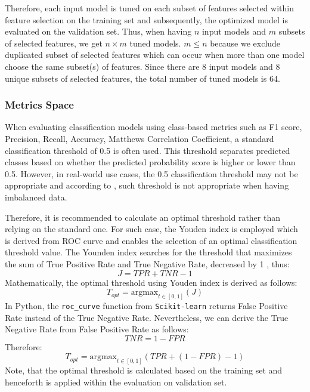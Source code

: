 \vspace{-1em}
Therefore, each input model is tuned on each subset of features selected within feature selection on the training set and subsequently, the optimized model is evaluated on the validation set. Thus, when having $n$ input models and $m$ subsets of selected features, we get $n \times m$ tuned models.
$m \leq n$ because we exclude duplicated subset of selected features which can occur when more than one model choose the same subset(s) of features.
Since there are 8 input models and 8 unique subsets of selected features, the total number of tuned models is 64.

\subsubsection{Metrics Space}

When evaluating classification models using class-based metrics such as F1 score, Precision, Recall, Accuracy, Matthews Correlation Coefficient, a standard classification threshold of 0.5 is often used. This threshold separates predicted classes based on whether the predicted probability score is higher or lower than 0.5.
However, in real-world use cases, the 0.5 classification threshold may not be appropriate and according to \citep{esposito2021ghost}, such threshold is not appropriate when having imbalanced data.

Therefore, it is recommended to calculate an optimal threshold rather than relying on the standard one.
For such case, the Youden index is employed which is derived from ROC curve and enables the selection of an optimal classification threshold value. 
The Younden index searches for the threshold that maximizes the sum of True Positive Rate and True Negative Rate, decreased by 1 \citep{fluss2005estimation}, thus:
\begin{equation}\label{eq}
J = TPR + TNR - 1
\end{equation}
Mathematically, the optimal threshold using Youden index is derived as follows:
\begin{equation}\label{eq}
T_{opt} = \text{argmax}_{t \in [0, 1]}\left(J\right)
\end{equation}
In Python, the \lstinline{roc_curve} function from \lstinline{Scikit-learn} returns False Positive Rate instead of the True Negative Rate. Nevertheless, we can derive the True Negative Rate from False Positive Rate as follows:
\begin{equation}\label{eq}
TNR =  1-FPR
\end{equation}
Therefore:
\begin{equation}\label{eq}
T_{opt} = \text{argmax}_{t \in [0, 1]}\left(TPR +  \left(1-FPR\right) - 1\right)
\end{equation}
Note, that the optimal threshold is calculated based on the training set and henceforth is applied within the evaluation on validation set.

